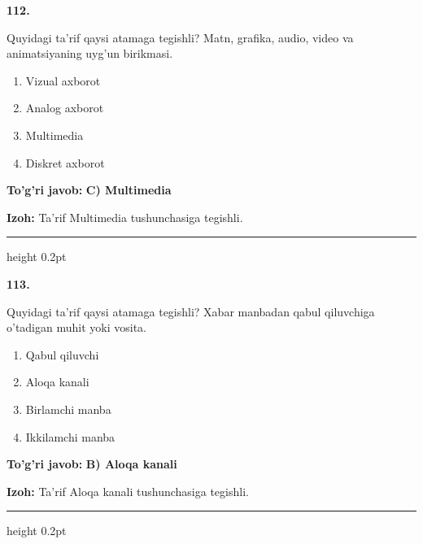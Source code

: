 \documentclass[10pt,a4paper,oneside]{article}
\begin{document}
\noindent\textbf{\color{ink}112.}
\par
Quyidagi ta'rif qaysi atamaga tegishli? Matn, grafika, audio, video va animatsiyaning uyg'un birikmasi.
\begin{enumerate}[label=\Alph*),leftmargin=9mm]
\item Vizual axborot
\item Analog axborot
\item Multimedia
\item Diskret axborot
\end{enumerate}
\begin{tcolorbox}[enhanced,breakable,colback=teal!4,colframe=teal!50!black,boxrule=0.5pt,arc=1.1mm,left=3mm,right=3mm,top=1.7mm,bottom=1.7mm,before skip=2mm,after skip=2mm]
\textbf{\color{teal}To'g'ri javob:} \textbf{C) Multimedia}
\par\smallskip
\textbf{Izoh:} Ta'rif Multimedia tushunchasiga tegishli.
\end{tcolorbox}
\vspace{2mm}\hrule height 0.2pt \vspace{3mm}

\noindent\textbf{\color{ink}113.}
\par
Quyidagi ta'rif qaysi atamaga tegishli? Xabar manbadan qabul qiluvchiga o'tadigan muhit yoki vosita.
\begin{enumerate}[label=\Alph*),leftmargin=9mm]
\item Qabul qiluvchi
\item Aloqa kanali
\item Birlamchi manba
\item Ikkilamchi manba
\end{enumerate}
\begin{tcolorbox}[enhanced,breakable,colback=teal!4,colframe=teal!50!black,boxrule=0.5pt,arc=1.1mm,left=3mm,right=3mm,top=1.7mm,bottom=1.7mm,before skip=2mm,after skip=2mm]
\textbf{\color{teal}To'g'ri javob:} \textbf{B) Aloqa kanali}
\par\smallskip
\textbf{Izoh:} Ta'rif Aloqa kanali tushunchasiga tegishli.
\end{tcolorbox}
\vspace{2mm}\hrule height 0.2pt \vspace{3mm}
\end{document}
